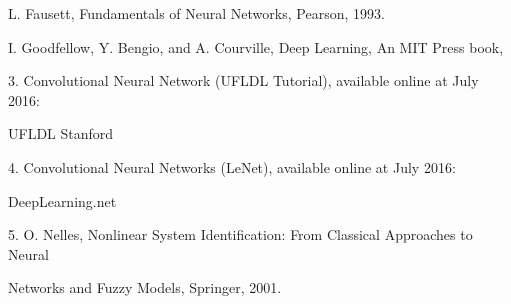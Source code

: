 \documentclass[12pt,a4paper]{article}
\begin{document}
L. Fausett, Fundamentals of Neural Networks, Pearson, 1993.\par
I. Goodfellow, Y. Bengio, and A. Courville, Deep Learning, An MIT Press book,\par
3. Convolutional Neural Network (UFLDL Tutorial), available online at July 2016:\par
UFLDL Stanford\par
4. Convolutional Neural Networks (LeNet), available online at July 2016:\par
DeepLearning.net\par
5. O. Nelles, Nonlinear System Identification: From Classical Approaches to Neural\par
Networks and Fuzzy Models, Springer, 2001.\par
\vspace{4pt}
\end{document}
